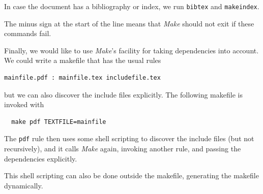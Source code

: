 In case the document has a bibliography or index, we run \lstinline{bibtex}
and \lstinline{makeindex}. 

The minus sign at the start of the line means that
\emph{Make} should not exit if these commands fail.

Finally, we would like to use \emph{Make}'s facility for taking
dependencies into account. 
We could write a makefile that has
the usual rules
\begin{lstlisting}
mainfile.pdf : mainfile.tex includefile.tex
\end{lstlisting}
but we can also discover the include files explicitly. The following
makefile is invoked with 
\begin{lstlisting}
  make pdf TEXTFILE=mainfile
\end{lstlisting}
The \lstinline{pdf} rule then uses some shell scripting to discover the
include files (but not recursively), and it calls \emph{Make} again,
invoking another rule, and passing the dependencies explicitly.

This shell scripting can also be done outside the makefile, generating
the makefile dynamically.

  



